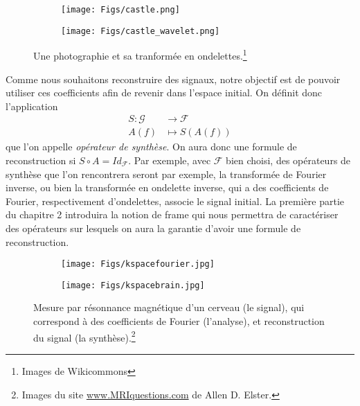 \begin{figure}[h]%
\centering
\begin{subfigure}{.5\textwidth}
  \centering
  \texttt{[image: Figs/castle.png]}
  \label{fig:sub1}
\end{subfigure}%
\begin{subfigure}{.5\textwidth}
  \centering
  \texttt{[image: Figs/castle\_wavelet.png]}
  \label{fig:sub2}
\end{subfigure}
	\caption{Une photographie et sa tranformée en ondelettes.\footnote{Images de Wikicommons}}
\label{fig:test}
\end{figure}
Comme nous souhaitons reconstruire des signaux, notre objectif est de pouvoir utiliser ces coefficients afin de revenir dans l'espace initial.
On définit donc l'application
\begin{align}
	S : \mathcal{G} &\longrightarrow \mathcal{F}\\
		A(f) &\longmapsto S(A(f))
\end{align}
que l'on appelle \emph{opérateur de synthèse}.
\newline
On aura donc une formule de reconstruction si $S \circ A = Id_{\mathcal{F}}$.
Par exemple, avec $\mathcal{F}$ bien choisi, des opérateurs de synthèse que l'on rencontrera seront par exemple, la transformée de Fourier inverse, ou bien la transformée en ondelette inverse, qui a des coefficients de Fourier, respectivement d'ondelettes, associe le signal initial.
La première partie du chapitre 2 introduira la notion de frame qui nous permettra de caractériser des opérateurs sur lesquels on aura la garantie d'avoir une formule de reconstruction.

\begin{figure}[h]%
\centering
\begin{subfigure}{.5\textwidth}
  \centering
  \texttt{[image: Figs/kspacefourier.jpg]}
  \label{fig:sub1}
\end{subfigure}%
\begin{subfigure}{.5\textwidth}
  \centering
  \texttt{[image: Figs/kspacebrain.jpg]}
  \label{fig:sub2}
\end{subfigure}
	\caption{Mesure par résonnance magnétique d'un cerveau (le signal), qui correspond à des coefficients de Fourier (l'analyse), et reconstruction du signal (la synthèse).\footnote{Images du site \url{www.MRIquestions.com} de Allen D. Elster.} }
\label{fig:test}
\end{figure}

